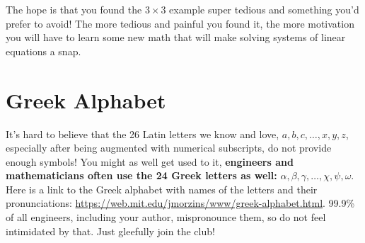 

\vspace*{.5cm}
\begin{tcolorbox}[sharp corners, colback=green!30, colframe=green!80!blue, title=\textbf{\Large Tedium and Pain $\boldsymbol{\implies}$ Motivation!}]
The hope is that you found the $3 \times 3$ example super tedious and something you'd prefer to avoid! The more tedious and painful you found it, the more motivation you will have to learn some new math that will make solving systems of linear equations a snap.
\end{tcolorbox}

\section{Greek Alphabet}
It's hard to believe that the 26 Latin letters we know and love, $a, b, c, \ldots, x, y, z$, especially after being augmented with numerical subscripts, do not provide enough symbols! You might as well get used to it, \textbf{engineers and mathematicians often use the 24 Greek letters as well:} $\alpha, \beta, \gamma, \ldots, \chi, \psi, \omega$. 
Here is a link to the Greek alphabet with names of the letters and their pronunciations: \url{https://web.mit.edu/jmorzins/www/greek-alphabet.html}.  99.9\% of all engineers, including your author, mispronounce them, so do not feel intimidated by that. Just gleefully join the club! \\

